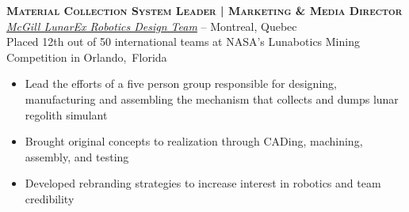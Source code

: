 \documentclass[11pt, letterpaper]{article}
\newcommand{\years}[1]{\marginnote{\footnotesize #1}} %
\begin{document}


  \begin{samepage}
    \years{8/2012 - 8/2013} \textbf{\scshape Material Collection System Leader | Marketing \& Media Director}\\
    \href{http://www.lunarex.mcgill.ca}{\textit{McGill LunarEx Robotics Design Team}} -- Montreal, Quebec\\
    {\small Placed 12th out of 50 international teams at NASA's Lunabotics Mining Competition in Orlando,~Florida}
    \begin{itemize}
      \item Lead the efforts of a five person group responsible for designing, manufacturing and assembling the mechanism that collects and dumps lunar regolith simulant
      \item Brought original concepts to realization through CADing, machining, assembly, and testing
      \item Developed rebranding strategies to increase interest in robotics and team credibility
    \end{itemize}
  \end{samepage}
\end{document}
